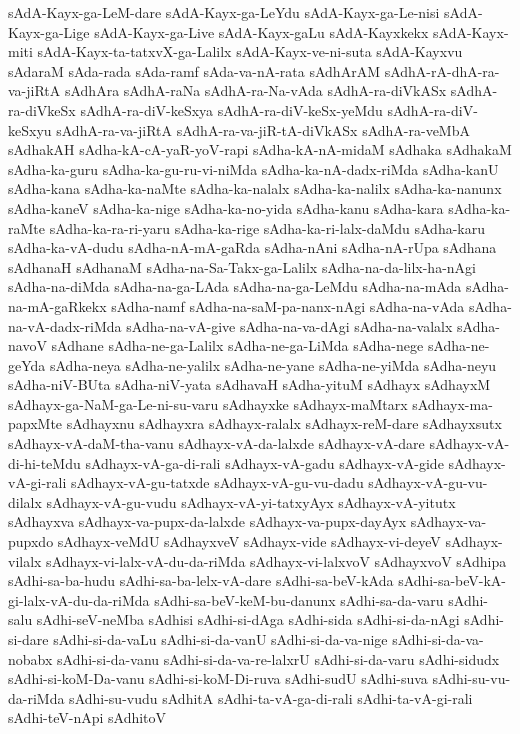 {sAdA-Kayx-ga-LeM-dare
sAdA-Kayx-ga-LeYdu
sAdA-Kayx-ga-Le-nisi
sAdA-Kayx-ga-Lige
sAdA-Kayx-ga-Live
sAdA-Kayx-gaLu
sAdA-Kayxkekx
sAdA-Kayx-miti
sAdA-Kayx-ta-tatxvX-ga-Lalilx
sAdA-Kayx-ve-ni-suta
sAdA-Kayxvu
sAdaraM
sAda-rada
sAda-ramf
sAda-va-nA-rata
sAdhArAM
sAdhA-rA-dhA-ra-va-jiRtA
sAdhAra
sAdhA-raNa
sAdhA-ra-Na-vAda
sAdhA-ra-diVkASx
sAdhA-ra-diVkeSx
sAdhA-ra-diV-keSxya
sAdhA-ra-diV-keSx-yeMdu
sAdhA-ra-diV-keSxyu
sAdhA-ra-va-jiRtA
sAdhA-ra-va-jiR-tA-diVkASx
sAdhA-ra-veMbA
sAdhakAH
sAdha-kA-cA-yaR-yoV-rapi
sAdha-kA-nA-midaM
sAdhaka
sAdhakaM
sAdha-ka-guru
sAdha-ka-gu-ru-vi-niMda
sAdha-ka-nA-dadx-riMda
sAdha-kanU
sAdha-kana
sAdha-ka-naMte
sAdha-ka-nalalx
sAdha-ka-nalilx
sAdha-ka-nanunx
sAdha-kaneV
sAdha-ka-nige
sAdha-ka-no-yida
sAdha-kanu
sAdha-kara
sAdha-ka-raMte
sAdha-ka-ra-ri-yaru
sAdha-ka-rige
sAdha-ka-ri-lalx-daMdu
sAdha-karu
sAdha-ka-vA-dudu
sAdha-nA-mA-gaRda
sAdha-nAni
sAdha-nA-rUpa
sAdhana
sAdhanaH
sAdhanaM
sAdha-na-Sa-Takx-ga-Lalilx
sAdha-na-da-lilx-ha-nAgi
sAdha-na-diMda
sAdha-na-ga-LAda
sAdha-na-ga-LeMdu
sAdha-na-mAda
sAdha-na-mA-gaRkekx
sAdha-namf
sAdha-na-saM-pa-nanx-nAgi
sAdha-na-vAda
sAdha-na-vA-dadx-riMda
sAdha-na-vA-give
sAdha-na-va-dAgi
sAdha-na-valalx
sAdha-navoV
sAdhane
sAdha-ne-ga-Lalilx
sAdha-ne-ga-LiMda
sAdha-nege
sAdha-ne-geYda
sAdha-neya
sAdha-ne-yalilx
sAdha-ne-yane
sAdha-ne-yiMda
sAdha-neyu
sAdha-niV-BUta
sAdha-niV-yata
sAdhavaH
sAdha-yituM
sAdhayx
sAdhayxM
sAdhayx-ga-NaM-ga-Le-ni-su-varu
sAdhayxke
sAdhayx-maMtarx
sAdhayx-ma-papxMte
sAdhayxnu
sAdhayxra
sAdhayx-ralalx
sAdhayx-reM-dare
sAdhayxsutx
sAdhayx-vA-daM-tha-vanu
sAdhayx-vA-da-lalxde
sAdhayx-vA-dare
sAdhayx-vA-di-hi-teMdu
sAdhayx-vA-ga-di-rali
sAdhayx-vA-gadu
sAdhayx-vA-gide
sAdhayx-vA-gi-rali
sAdhayx-vA-gu-tatxde
sAdhayx-vA-gu-vu-dadu
sAdhayx-vA-gu-vu-dilalx
sAdhayx-vA-gu-vudu
sAdhayx-vA-yi-tatxyAyx
sAdhayx-vA-yitutx
sAdhayxva
sAdhayx-va-pupx-da-lalxde
sAdhayx-va-pupx-dayAyx
sAdhayx-va-pupxdo
sAdhayx-veMdU
sAdhayxveV
sAdhayx-vide
sAdhayx-vi-deyeV
sAdhayx-vilalx
sAdhayx-vi-lalx-vA-du-da-riMda
sAdhayx-vi-lalxvoV
sAdhayxvoV
sAdhipa
sAdhi-sa-ba-hudu
sAdhi-sa-ba-lelx-vA-dare
sAdhi-sa-beV-kAda
sAdhi-sa-beV-kA-gi-lalx-vA-du-da-riMda
sAdhi-sa-beV-keM-bu-danunx
sAdhi-sa-da-varu
sAdhi-salu
sAdhi-seV-neMba
sAdhisi
sAdhi-si-dAga
sAdhi-sida
sAdhi-si-da-nAgi
sAdhi-si-dare
sAdhi-si-da-vaLu
sAdhi-si-da-vanU
sAdhi-si-da-va-nige
sAdhi-si-da-va-nobabx
sAdhi-si-da-vanu
sAdhi-si-da-va-re-lalxrU
sAdhi-si-da-varu
sAdhi-sidudx
sAdhi-si-koM-Da-vanu
sAdhi-si-koM-Di-ruva
sAdhi-sudU
sAdhi-suva
sAdhi-su-vu-da-riMda
sAdhi-su-vudu
sAdhitA
sAdhi-ta-vA-ga-di-rali
sAdhi-ta-vA-gi-rali
sAdhi-teV-nApi
sAdhitoV
}
